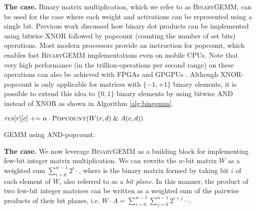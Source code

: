 \documentclass[sigconf]{acmart}
\begin{document}
\label{sec:bingemm}
\textbf{The  case.}
Binary matrix multiplication, which we refer to as \textsc{BinaryGEMM}, can be used for the case where each weight and activations can be represented using a single bit. 
Previous work \cite{fptbnn, binarynet, xnornet} discussed how binary dot products can be implemented using bitwise XNOR followed by popcount (counting the number of set bits) operations.
Most modern processors provide an instruction for popcount, which enables fast \textsc{BinaryGEMM} implementations even on mobile CPUs.
Note that very high performance (in the trillion-operations per second range) on these operations can also be achieved with FPGAs \cite{finn,fptbnn} and GPGPUs \cite{binarynet}.
Although XNOR-popcount is only applicable for matrices with $\{-1, +1\}$ binary elements, it is possible to extend this idea to $\{0, 1\}$ binary elements by using bitwise AND instead of XNOR as shown in Algorithm \ref{alg:bingemm}.


\begin{algorithm}[t]
	\centering
	\footnotesize
	\begin{algorithmic}
		\algrenewcommand\algorithmicindent{1.0em}%
					\State $res[r][c] \pluseq \alpha \cdot \Call{Popcount}{W(r, d) \mathrel{\&} A(c, d)} $
				\EndFor
			\EndFor
		\EndFor

		\EndFunction
	\end{algorithmic}
	\caption{ GEMM using AND-popcount.}
	\label{alg:bingemm}
\end{algorithm}

\textbf{The  case.}
\label{sec:bsgemm}
We now leverage \textsc{BinaryGEMM} as a building block for implementing few-bit integer matrix multiplication.
We can rewrite the $w$-bit matrix $W$ as a weighted sum $\sum_{i=0}^{w-1} 2^i \cdot$, where  is the binary matrix formed by taking bit $i$ of each element of $W$, also referred to as a \emph{bit plane}.
In this manner, the product of two few-bit integer matrices can be written as a weighted sum of the pairwise products of their bit planes, i.e. $W \cdot A = \sum_{i=0}^{w-1} \sum_{j=0}^{a-1} 2^{i+j} \cdot$$\cdot$.
\end{document}
